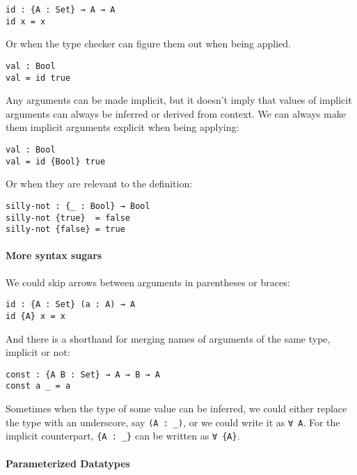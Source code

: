 \documentclass[12pt, a4paper]{article}
\begin{document}
\begin{lstlisting}
id : {A : Set} → A → A
id x = x
\end{lstlisting}

Or when the type checker can figure them out when being applied.

\begin{lstlisting}
val : Bool
val = id true
\end{lstlisting}

Any arguments can be made implicit, but it doesn't imply that values of
implicit arguments can always be inferred or derived from context. We can always
make them implicit arguments explicit when being applying:

\begin{lstlisting}
val : Bool
val = id {Bool} true
\end{lstlisting}

Or when they are relevant to the definition:

\begin{lstlisting}
silly-not : {_ : Bool} → Bool
silly-not {true}  = false
silly-not {false} = true
\end{lstlisting}

\paragraph{More syntax sugars}
We could skip arrows between arguments in parentheses or braces:

\begin{lstlisting}
id : {A : Set} (a : A) → A
id {A} x = x
\end{lstlisting}

And there is a shorthand for merging names of arguments of the same type, implicit or not:

\begin{lstlisting}
const : {A B : Set} → A → B → A
const a _ = a
\end{lstlisting}

Sometimes when the type of some value can be inferred, we could either replace
the type with an underscore, say {\lstinline|(A : _)|}, or we could write it as
{\lstinline|∀ A|}. For the implicit counterpart, {\lstinline|{A : _}|} can be
written as {\lstinline|∀ {A}|}.

\paragraph{Parameterized Datatypes}
\end{document}

